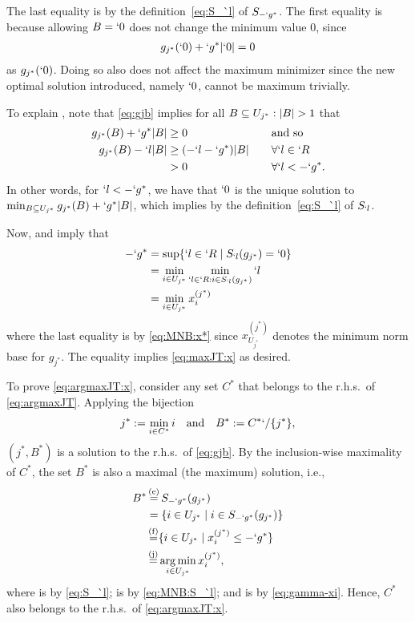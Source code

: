 \begin{Proof}
\begin{compactitem}
	The last equality is by the definition~\eqref{eq:S_`l} of $S_{-`g^*}$. The first equality is because allowing $B=`0$ does not change the minimum value $0$, since
	\begin{align*}
		g_{j^*}(`0)+`g^*\abs {`0}=0
	\end{align*}
	 as $g_{j^*}(`0)$. Doing so also does not affect the maximum minimizer since the new optimal solution introduced, namely $`0$, cannot be maximum trivially.
	\item To explain , note that \eqref{eq:gjb} implies for all $B\subseteq U_{j^*}:\abs {B}>1$ that
	\begin{alignat*}{2}
		g_{j^*}(B)+`g^*\abs{B} &\geq 0&\kern1em& \text {and so}\\
		g_{j^*}(B)-`l\abs{B} &\geq (-`l-`g^*) \abs {B} && \forall `l\in `R\\
		& > 0 && \forall `l<-`g^*.
	\end{alignat*}
	In other words, for $`l<-`g^*$, we have that $`0$ is the unique solution to $\min_{B\subseteq U_{j^*}} g_{j^*}(B)+`g^*\abs{B}$, which implies  by the definition~\eqref{eq:S_`l} of $S_{`l}$.
\end{compactitem}
Now,  and  imply that
\begin{align}
	-`g^*&=\sup \Set{`l\in `R\mid S_{`l}(g_{j^*})=`0} \nonumber \\
	&= \min_{i\in U_{j^*}} \min_{`l\in `R:i\in S_{`l}(g_{j^*})} `l \nonumber \\
	&= \min_{i\in U_{j^*}} x^{(j^*)}_i
	\label{eq:gamma-xi}
\end{align}
where the last equality is by \eqref{eq:MNB:x*} since $x^{(j^*)}_{U_{j^*}}$ denotes the minimum norm base for $g_{j^*}$. The equality implies \eqref{eq:maxJT:x} as desired.

To prove \eqref{eq:argmaxJT:x}, consider any set $C^*$ that belongs to the r.h.s.\ of \eqref{eq:argmaxJT}. Applying the bijection
	\begin{align*}
	j^*:=\min_{i\in C^*} i
	\kern 1em \text {and}\kern1em B^*:=C^*`/\Set{j^*},
\end{align*}
$(j^*,B^*)$ is a solution to the r.h.s.\ of \eqref{eq:gjb}. By the inclusion-wise maximality of $C^*$, the set $B^*$ is also a maximal (the maximum) solution, i.e.,
\begin{align*}
	B^*&\utag{e}= S_{-`g^*}(g_{j^*})\\
	&= \Set {i\in U_{j^*}\mid i\in S_{-`g^*}(g_{j^*}) }\\
	&\utag{f}= \Set {i\in U_{j^*} \mid x^{(j^*)}_i \leq -`g^*}\\
	&\utag{j}= \argmin_{i\in U_{j^*}} x^{(j^*)}_i,
\end{align*}
where  is by \eqref{eq:S_`l};  is by \eqref{eq:MNB:S_`l}; and  is by
\eqref{eq:gamma-xi}. Hence, $C^*$ also belongs to the r.h.s.\ of \eqref{eq:argmaxJT:x}. 


\end{Proof}
